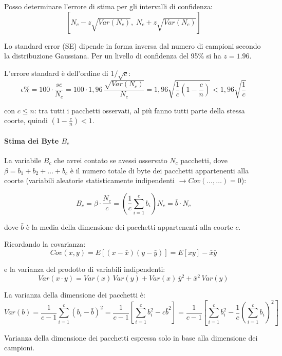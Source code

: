 Posso determinare l'errore di stima per gli intervalli
di confidenza:
\[
    \left[
        N_c - z\sqrt{Var(N_c)},\;
        N_c + z\sqrt{Var(N_c)}
    \right]
\]

Lo standard error (SE) dipende in forma inversa dal numero
di campioni secondo la distribuzione Gaussiana. Per un
livello di confidenza del 95\% si ha $z = 1.96$.

L'errore standard è dell'ordine di $1/\sqrt{c}$:
\[
    \epsilon\%
    = 100 \cdot \frac{se}{N_c}
    = 100 \cdot 1{,}96 \, \frac{\sqrt{Var(N_c)}}{N_c}
    = 1{,}96 \sqrt{\frac{1}{c}\!\left(1-\frac{c}{n}\right)}
    < 1{,}96 \sqrt{\frac{1}{c}}
\]

con $c \leq n$: tra tutti i pacchetti osservati, al più
fanno tutti parte della stessa coorte, quindi
$(1 - \frac{c}{n}) < 1$.

\paragraph{Stima dei Byte $B_c$}

La variabile $B_c$ che avrei contato se avessi osservato
$N_c$ pacchetti, dove $\beta = b_1 + b_2 + \dots + b_c$ è
il numero totale di byte dei pacchetti appartenenti alla
coorte (variabili aleatorie statisticamente indipendenti
$\rightarrow Cov(\dots, \dots) = 0$):

\[
    B_c
    = \beta \cdot \frac{N_c}{c}
    = \left(\frac{1}{c}\sum_{i=1}^{c} b_i\right) N_c
    = \bar{b} \cdot N_c
\]

dove $\bar{b}$ è la media della dimensione dei pacchetti
appartenenti alla coorte $c$.

Ricordando la covarianza:
\[
    Cov(x,y)
    = E[(x-\bar{x})(y-\bar{y})]
    = E[xy] - \bar{x}\bar{y}
\]

e la varianza del prodotto di variabili indipendenti:
\[
    Var(x \cdot y)
    = Var(x)\,Var(y) + Var(x)\,\bar{y}^2
      + \bar{x}^2\,Var(y)
\]

La varianza della dimensione dei pacchetti è:
\[
    Var(b)
    = \frac{1}{c-1} \sum_{i=1}^{c} (b_i - \bar{b})^2
    = \frac{1}{c-1}
      \left[
          \sum_{i=1}^{c} b_i^2 - c\bar{b}^2
      \right]
    = \frac{1}{c-1}
      \left[
          \sum_{i=1}^{c} b_i^2
          - \frac{1}{c}
            \left(\sum_{i=1}^{c} b_i\right)^2
      \right]
\]

Varianza della dimensione dei pacchetti espressa solo in
base alla dimensione dei campioni.
